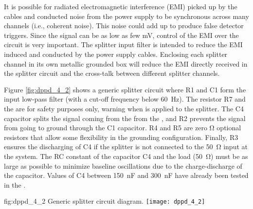It is possible for radiated electromagnetic interference (EMI) picked up by the cables and conducted noise from the  power supply to be synchronous across many  channels (i.e., coherent noise). This noise could add up to produce false detector triggers. Since the  signal can be as low as few \si{mV}, %
control of the EMI over the circuit is very important. The splitter  input filter is intended to reduce the EMI induced and conducted by the power supply cables. Enclosing each splitter channel in its own metallic grounded box will reduce the EMI directly received in the splitter circuit and %
the cross-talk between different splitter channels.

Figure \ref{fig:dppd_4_2} shows a generic splitter circuit where R1 and C1 form the  input low-pass filter (with a cut-off frequency below \SI{60}{Hz}). The resistor R7 and the   are for safety purposes only, warning when  is applied to the splitter. The C4 capacitor splits the signal coming from the  from the , and R2 prevents the  signal from going to ground through the C1 capacitor. R4 and R5 are zero \si{\ohm} optional resistors that allow some flexibility in the grounding configuration. Finally, R3 ensures the discharging of C4 if the splitter is not connected to the \SI{50}{\ohm} input at the  system. The RC constant of the capacitor C4 and the load (\SI{50}{\ohm}) must be as large as possible to minimize baseline oscillations due to the charge-discharge of the capacitor. Values of C4 between \SI{150}{nF} and \SI{300}{nF} have already been tested in the  . %

\begin{dunefigure}{fig:dppd_4_2}
{Generic splitter circuit diagram.}
\texttt{[image: dppd\_4\_2]}
\end{dunefigure}

